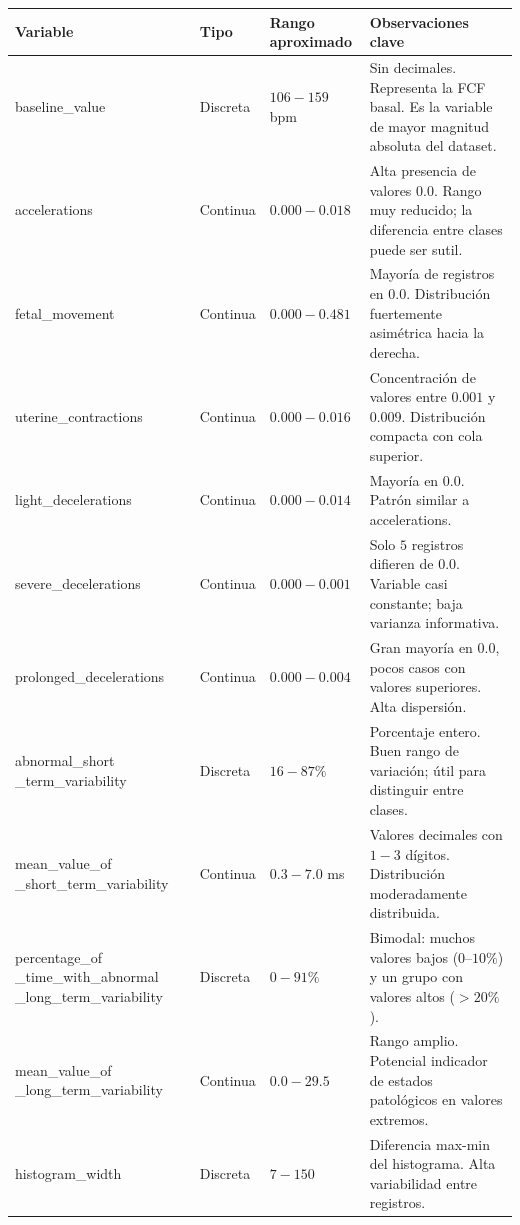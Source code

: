 \documentclass[12pt,letterpaper]{article}
\renewcommand{\arraystretch}{1.30}
\begin{document}
\begin{table}[H]
\centering
\small
\renewcommand{\arraystretch}{1.3}
\begin{tabular}{|p{4.2cm}|p{1.7cm}|p{2.4cm}|p{7cm}|}
\hline
\rowcolor{headbg}
\textbf{Variable} & \textbf{Tipo} & \textbf{Rango aproximado} & \textbf{Observaciones clave} \\
\hline
baseline\_value & Discreta & $106 - 159$ bpm & Sin decimales. Representa la FCF basal. Es la variable de mayor magnitud absoluta del dataset. \\
\hline
accelerations & Continua & $0.000 - 0.018$ & Alta presencia de valores $0.0$. Rango muy reducido; la diferencia entre clases puede ser sutil. \\
\hline
fetal\_movement & Continua & $0.000 - 0.481$ & Mayoría de registros en $0.0$. Distribución fuertemente asimétrica hacia la derecha. \\
\hline
uterine\_contractions & Continua & $0.000 - 0.016$ & Concentración de valores entre $0.001$ y $0.009$. Distribución compacta con cola superior. \\
\hline
light\_decelerations & Continua & $0.000 - 0.014$ & Mayoría en $0.0$. Patrón similar a accelerations. \\
\hline
severe\_decelerations & Continua & $0.000 - 0.001$ & Solo $5$ registros difieren de $0.0$. Variable casi constante; baja varianza informativa. \\
\hline
prolonged\_decelerations & Continua & $0.000 - 0.004$ & Gran mayoría en $0.0$, pocos casos con valores superiores. Alta dispersión. \\
\hline
abnormal\_short \_term\_variability & Discreta & $16 - 87 \%$ & Porcentaje entero. Buen rango de variación; útil para distinguir entre clases. \\
\hline
mean\_value\_of \_short\_term\_variability & Continua & $0.3 - 7.0$ ms & Valores decimales con $1-3$ dígitos. Distribución moderadamente distribuida. \\
\hline
percentage\_of \_time\_with\_abnormal \_long\_term\_variability & Discreta & $0 - 91 \%$ & Bimodal: muchos valores bajos ($0$--$10\%$) y un grupo con valores altos ($>20\%$). \\
\hline
mean\_value\_of \_long\_term\_variability & Continua & $0.0 - 29.5$ & Rango amplio. Potencial indicador de estados patológicos en valores extremos. \\
\hline
histogram\_width & Discreta & $7 - 150$ & Diferencia max-min del histograma. Alta variabilidad entre registros. \\

\end{tabular}
\end{table}
\end{document}
